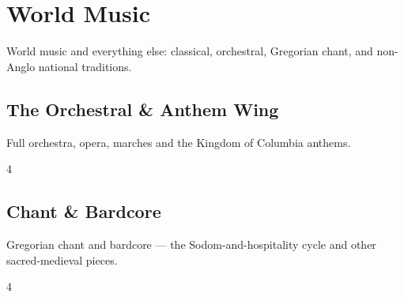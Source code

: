 \documentclass[a4paper,landscape]{memoir}
\begin{document}
\part{World Music}
World music and everything else: classical, orchestral, Gregorian chant, and non-Anglo national traditions.

\chapter{The Orchestral \& Anthem Wing}
Full orchestra, opera, marches and the Kingdom of Columbia anthems.
\clearpage\begin{multicols*}{4}
\end{multicols*}

\chapter{Chant \& Bardcore}
Gregorian chant and bardcore — the Sodom-and-hospitality cycle and other sacred-medieval pieces.
\clearpage\begin{multicols*}{4}
\end{multicols*}
\end{document}
